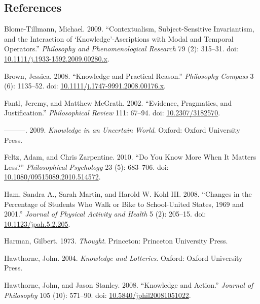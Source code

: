 \documentclass[
  10pt,
  letterpaper,
  DIV=11,
  numbers=noendperiod,
  twoside]{scrartcl}
\newlength{\cslhangindent}
\newenvironment{CSLReferences}[2] %
 {\begin{list}{}{%
  \setlength{\itemindent}{0pt}
  \setlength{\leftmargin}{0pt}
  \setlength{\parsep}{0pt}
  \ifodd #1
   \setlength{\leftmargin}{\cslhangindent}
   \setlength{\itemindent}{-1\cslhangindent}
  \fi
  \setlength{\itemsep}{#2\baselineskip}}}
 {\end{list}}
\begin{document}
\subsection*{References}\label{references}

\label{refs}
\begin{CSLReferences}{1}{0}
Blome-Tillmann, Michael. 2009. {``Contextualism, Subject-Sensitive
Invariantism, and the Interaction of {`Knowledge'}-Ascriptions with
Modal and Temporal Operators.''} \emph{Philosophy and Phenomenological
Research} 79 (2): 315--31. doi:
\href{https://doi.org/10.1111/j.1933-1592.2009.00280.x}{10.1111/j.1933-1592.2009.00280.x}.

Brown, Jessica. 2008. {``Knowledge and Practical Reason.''}
\emph{Philosophy Compass} 3 (6): 1135--52. doi:
\href{https://doi.org/10.1111/j.1747-9991.2008.00176.x}{10.1111/j.1747-9991.2008.00176.x}.

Fantl, Jeremy, and Matthew McGrath. 2002. {``Evidence, Pragmatics, and
Justification.''} \emph{Philosophical Review} 111: 67--94. doi:
\href{https://doi.org/10.2307/3182570}{10.2307/3182570}.

---------. 2009. \emph{Knowledge in an Uncertain World}. Oxford: Oxford
University Press.

Feltz, Adam, and Chris Zarpentine. 2010. {``Do You Know More When It
Matters Less?''} \emph{Philosophical Psychology} 23 (5): 683--706. doi:
\href{https://doi.org/10.1080/09515089.2010.514572}{10.1080/09515089.2010.514572}.

Ham, Sandra A., Sarah Martin, and Harold W. Kohl III. 2008. {``Changes
in the Percentage of Students Who Walk or Bike to School-United States,
1969 and 2001.''} \emph{Journal of Physical Activity and Health} 5 (2):
205--15. doi:
\href{https://doi.org/10.1123/jpah.5.2.205}{10.1123/jpah.5.2.205}.

Harman, Gilbert. 1973. \emph{Thought}. Princeton: Princeton University
Press.

Hawthorne, John. 2004. \emph{Knowledge and Lotteries}. Oxford: Oxford
University Press.

Hawthorne, John, and Jason Stanley. 2008. {``{Knowledge and Action}.''}
\emph{Journal of Philosophy} 105 (10): 571--90. doi:
\href{https://doi.org/10.5840/jphil20081051022}{10.5840/jphil20081051022}.


\end{CSLReferences}
\end{document}
